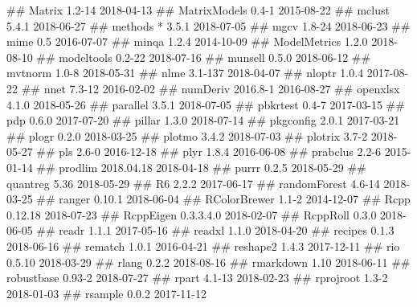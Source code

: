 \documentclass[]{book}
\newenvironment{Shaded}{\begin{snugshade}}{\end{snugshade}}
\newcommand{\NormalTok}[1]{#1}
\theoremstyle{definition}
\theoremstyle{definition}
\theoremstyle{definition}
\theoremstyle{remark}
\begin{document}
\begin{Shaded}
\begin{Highlighting}[]
\NormalTok{##  Matrix          1.2-14     2018-04-13}
\NormalTok{##  MatrixModels    0.4-1      2015-08-22}
\NormalTok{##  mclust          5.4.1      2018-06-27}
\NormalTok{##  methods       * 3.5.1      2018-07-05}
\NormalTok{##  mgcv            1.8-24     2018-06-23}
\NormalTok{##  mime            0.5        2016-07-07}
\NormalTok{##  minqa           1.2.4      2014-10-09}
\NormalTok{##  ModelMetrics    1.2.0      2018-08-10}
\NormalTok{##  modeltools      0.2-22     2018-07-16}
\NormalTok{##  munsell         0.5.0      2018-06-12}
\NormalTok{##  mvtnorm         1.0-8      2018-05-31}
\NormalTok{##  nlme            3.1-137    2018-04-07}
\NormalTok{##  nloptr          1.0.4      2017-08-22}
\NormalTok{##  nnet            7.3-12     2016-02-02}
\NormalTok{##  numDeriv        2016.8-1   2016-08-27}
\NormalTok{##  openxlsx        4.1.0      2018-05-26}
\NormalTok{##  parallel        3.5.1      2018-07-05}
\NormalTok{##  pbkrtest        0.4-7      2017-03-15}
\NormalTok{##  pdp             0.6.0      2017-07-20}
\NormalTok{##  pillar          1.3.0      2018-07-14}
\NormalTok{##  pkgconfig       2.0.1      2017-03-21}
\NormalTok{##  plogr           0.2.0      2018-03-25}
\NormalTok{##  plotmo          3.4.2      2018-07-03}
\NormalTok{##  plotrix         3.7-2      2018-05-27}
\NormalTok{##  pls             2.6-0      2016-12-18}
\NormalTok{##  plyr            1.8.4      2016-06-08}
\NormalTok{##  prabclus        2.2-6      2015-01-14}
\NormalTok{##  prodlim         2018.04.18 2018-04-18}
\NormalTok{##  purrr           0.2.5      2018-05-29}
\NormalTok{##  quantreg        5.36       2018-05-29}
\NormalTok{##  R6              2.2.2      2017-06-17}
\NormalTok{##  randomForest    4.6-14     2018-03-25}
\NormalTok{##  ranger          0.10.1     2018-06-04}
\NormalTok{##  RColorBrewer    1.1-2      2014-12-07}
\NormalTok{##  Rcpp            0.12.18    2018-07-23}
\NormalTok{##  RcppEigen       0.3.3.4.0  2018-02-07}
\NormalTok{##  RcppRoll        0.3.0      2018-06-05}
\NormalTok{##  readr           1.1.1      2017-05-16}
\NormalTok{##  readxl          1.1.0      2018-04-20}
\NormalTok{##  recipes         0.1.3      2018-06-16}
\NormalTok{##  rematch         1.0.1      2016-04-21}
\NormalTok{##  reshape2        1.4.3      2017-12-11}
\NormalTok{##  rio             0.5.10     2018-03-29}
\NormalTok{##  rlang           0.2.2      2018-08-16}
\NormalTok{##  rmarkdown       1.10       2018-06-11}
\NormalTok{##  robustbase      0.93-2     2018-07-27}
\NormalTok{##  rpart           4.1-13     2018-02-23}
\NormalTok{##  rprojroot       1.3-2      2018-01-03}
\NormalTok{##  rsample         0.0.2      2017-11-12}

\end{Highlighting}
\end{Shaded}
\end{document}
